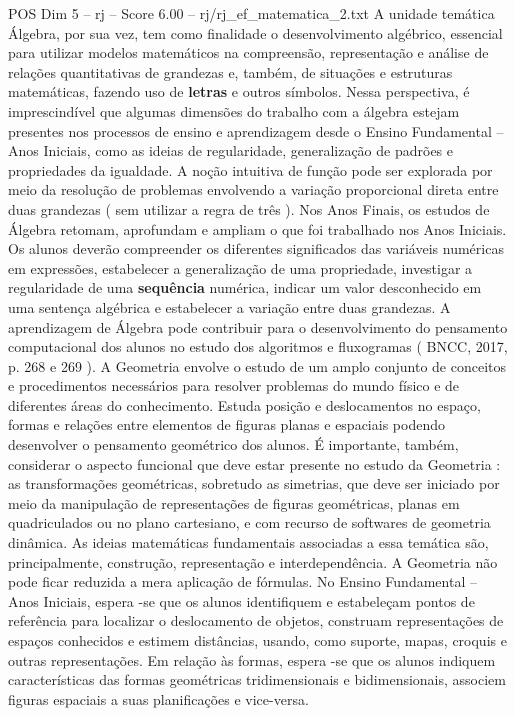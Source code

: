 \begin{textsample}{POS Dim 5 – rj – Score 6.00 – rj/rj\_ef\_matematica\_2.txt}
A unidade temática Álgebra, por sua vez, tem como finalidade o desenvolvimento algébrico, essencial para utilizar modelos matemáticos na compreensão, representação e análise de relações quantitativas de grandezas e, também, de situações e estruturas matemáticas, fazendo uso de \textbf{letras} e outros símbolos.
Nessa perspectiva, é imprescindível que algumas dimensões do trabalho com a álgebra estejam presentes nos processos de ensino e aprendizagem desde o Ensino Fundamental – Anos Iniciais, como as ideias de regularidade, generalização de padrões e propriedades da igualdade.
A noção intuitiva de função pode ser explorada por meio da resolução de problemas envolvendo a variação proporcional direta entre duas grandezas ( sem utilizar a regra de três ).
Nos Anos Finais, os estudos de Álgebra retomam, aprofundam e ampliam o que foi trabalhado nos Anos Iniciais.
Os alunos deverão compreender os diferentes significados das variáveis numéricas em expressões, estabelecer a generalização de uma propriedade, investigar a regularidade de uma \textbf{sequência} numérica, indicar um valor desconhecido em uma sentença algébrica e estabelecer a variação entre duas grandezas.
A aprendizagem de Álgebra pode contribuir para o desenvolvimento do pensamento computacional dos alunos no estudo dos algoritmos e fluxogramas ( BNCC, 2017, p. 268 e 269 ).
A Geometria envolve o estudo de um amplo conjunto de conceitos e procedimentos necessários para resolver problemas do mundo físico e de diferentes áreas do conhecimento.
Estuda posição e deslocamentos no espaço, formas e relações entre elementos de figuras planas e espaciais podendo desenvolver o pensamento geométrico dos alunos.
É importante, também, considerar o aspecto funcional que deve estar presente no estudo da Geometria : as transformações geométricas, sobretudo as simetrias, que deve ser iniciado por meio da manipulação de representações de figuras geométricas, planas em quadriculados ou no plano cartesiano, e com recurso de softwares de geometria dinâmica.
As ideias matemáticas fundamentais associadas a essa temática são, principalmente, construção, representação e interdependência.
A Geometria não pode ficar reduzida a mera aplicação de fórmulas.
No Ensino Fundamental – Anos Iniciais, espera -se que os alunos identifiquem e estabeleçam pontos de referência para localizar o deslocamento de objetos, construam representações de espaços conhecidos e estimem distâncias, usando, como suporte, mapas, croquis e outras representações.
Em relação às formas, espera -se que os alunos indiquem características das formas geométricas tridimensionais e bidimensionais, associem figuras espaciais a suas planificações e vice-versa.

\end{textsample}
